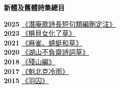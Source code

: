 \documentclass[14pt]{extarticle}
\begin{document}
\thispagestyle{empty}

\textbf{新體及舊體詩集總目}\\

\bigskip

\textbf{2025} \href{https://hueyzwen.github.io/poetry/潜庵歌诗长短句类编删定注.pdf}{《潛庵歌詩長短句類編刪定注》}\\

\textbf{2023} \href{https://hueyzwen.github.io/poetry/椇貝女化了草.pdf}{《椇貝女化了草》}\\

\textbf{2021} \href{https://hueyzwen.github.io/poetry/麻雀、蜻蜓和草.pdf}{《麻雀、蜻蜓和草》}\\

\textbf{2020} \href{https://hueyzwen.github.io/poetry/湖山不负斋诗词草.pdf}{《湖山不負齋詩詞草》}\\

\textbf{2018} \href{https://hueyzwen.github.io/poetry/残山编.pdf}{《殘山編》}\\

\textbf{2017} \href{https://hueyzwen.github.io/poetry/魁北克冷雨.pdf}{《魁北克冷雨》}\\

\textbf{2015} \href{https://hueyzwen.github.io/poetry/羽囚.pdf}{《羽囚》}
\end{document}
